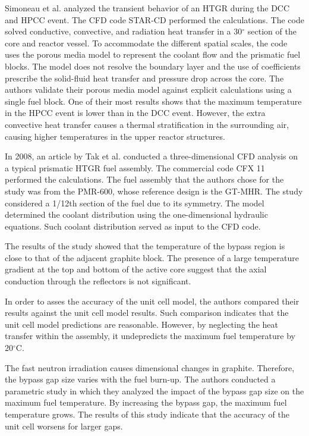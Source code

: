 \documentclass[11pt,letterpaper]{article}
\begin{document}
Simoneau et al. \cite{simoneau_three-dimensional_2007} analyzed the transient behavior of an \gls{HTGR} during the \gls{DCC} and \gls{HPCC} event.
The CFD code STAR-CD \cite{computational_dynamics_limited_star-cd_2004} performed the calculations.
The code solved conductive, convective, and radiation heat transfer in a 30$^{\circ}$ section of the core and reactor vessel.
To accommodate the different spatial scales, the code uses the porous media model to represent the coolant flow and the prismatic fuel blocks.
The model does not resolve the boundary layer and the use of coefficients prescribe the solid-fluid heat transfer and pressure drop across the core.
The authors validate their porous media model against explicit calculations using a single fuel block.
One of their most results shows that the maximum temperature in the \gls{HPCC} event is lower than in the \gls{DCC} event.
However, the extra convective heat transfer causes a thermal stratification in the surrounding air, causing higher temperatures in the upper reactor structures.

In 2008, an article by Tak et al. \cite{tak_numerical_2008} conducted  a three-dimensional \gls{CFD} analysis on a typical prismatic HTGR fuel assembly.
The commercial code CFX 11 \cite{ansys_incorporated_cfx_2006} performed the calculations.
The fuel assembly that the authors chose for the study was from the PMR-600, whose reference design is the GT-MHR.
The study considered a 1/12th section of the fuel due to its symmetry.
The model determined the coolant distribution using the one-dimensional hydraulic equations.
Such coolant distribution served as input to the CFD code.

The results of the study showed that the temperature of the bypass region is close to that of the adjacent graphite block.
The presence of a large temperature gradient at the top and bottom of the active core suggest that the axial conduction through the reflectors is not significant.

In order to asses the accuracy of the unit cell model, the authors compared their results against the unit cell model results.
Such comparison indicates that the unit cell model predictions are reasonable.
However, by neglecting the heat transfer within the assembly, it undepredicts the maximum fuel temperature by 20$^{\circ}$C.

The fast neutron irradiation causes dimensional changes in graphite.
Therefore, the bypass gap size varies with the fuel burn-up.
The authors conducted a parametric study in which they analyzed the impact of the bypass gap size on the maximum fuel temperature.
By increasing the bypass gap, the maximum fuel temperature grows.
The results of this study indicate that the accuracy of the unit cell worsens for larger gaps.
\end{document}
